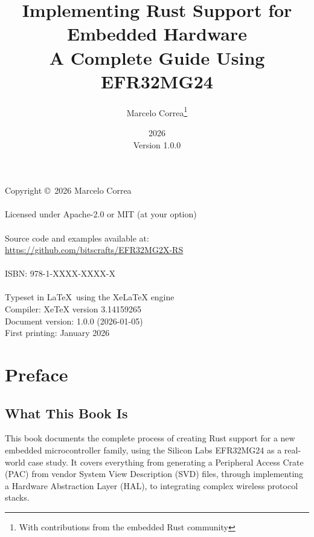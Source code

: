 \documentclass[11pt,a4paper,twoside,openright]{book}
\title{\textbf{Implementing Rust Support for Embedded Hardware}\\\Large A Complete Guide Using EFR32MG24}
\author{Marcelo Correa\thanks{With contributions from the embedded Rust community}}
\date{2026\\Version 1.0.0}
\begin{document}
\frontmatter

\maketitle

\thispagestyle{empty}
\begin{center}
    \vspace*{\fill}
    Copyright \copyright\ 2026 Marcelo Correa\\
    \\
    Licensed under Apache-2.0 or MIT (at your option)\\
    \\
    Source code and examples available at:
    \\
    \url{https://github.com/bitscrafts/EFR32MG2X-RS}\\
    \\
    ISBN: 978-1-XXXX-XXXX-X\\
    \\
    Typeset in \LaTeX\ using the XeLaTeX engine
    \\
    Compiler: XeTeX version 3.14159265
    \\
    Document version: 1.0.0 (2026-01-05)
    \\
    First printing: January 2026
    \vspace*{\fill}
\end{center}
\clearpage

\tableofcontents
\clearpage

\listoffigures
\clearpage

\lstlistoflistings
{}
\clearpage

\chapter*{Preface}

\section*{What This Book Is}

This book documents the complete process of creating Rust support for a new embedded microcontroller family, using the Silicon Labs EFR32MG24 as a real-world case study. It covers everything from generating a Peripheral Access Crate (PAC) from vendor System View Description (SVD) files, through implementing a Hardware Abstraction Layer (HAL), to integrating complex wireless protocol stacks.
\end{document}
